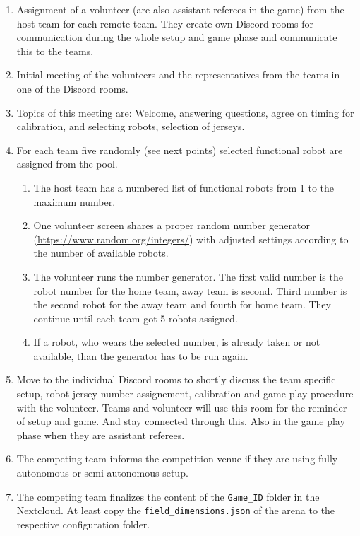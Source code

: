     \begin{enumerate}
        \item Assignment of a volunteer (are also assistant referees in the game) from the host team for each remote team. They create own Discord rooms for communication during the whole setup and game phase and communicate this to the teams.
        \item Initial meeting of the volunteers and the representatives from the teams in one of the Discord rooms.
        \item Topics of this meeting are: Welcome, answering questions, agree on timing for calibration, and selecting robots, selection of jerseys.
		\item For each team five randomly (see next points) selected functional robot are assigned from the pool.
		\begin{enumerate}
            \item The host team has a numbered list of functional robots from 1 to the maximum number.
            \item One volunteer screen shares a proper random number generator (\url{https://www.random.org/integers/}) with adjusted settings according to the number of available robots.
            \item The volunteer runs the number generator. The first valid number is the robot number for the home team, away team is second. Third number is the second robot for the away team and fourth for home team. They continue until each team got 5 robots assigned. 
            \item If a robot, who wears the selected number, is already taken or not available, than the generator has to be run again. 
        \end{enumerate} 
        \item Move to the individual Discord rooms to shortly discuss the team specific setup, robot jersey number assignement, calibration and game play procedure with the volunteer. Teams and volunteer will use this room for the reminder of setup and game. And stay connected through this. Also in the game play phase when they are assistant referees.
        \item The competing team informs the competition venue if they are using fully-autonomous or semi-autonomous setup.
        \item The competing team finalizes the content of the \texttt{Game\_ID} folder in the Nextcloud. At least copy the \texttt{field\_dimensions.json} of the arena to the respective configuration folder.

\end{enumerate}
